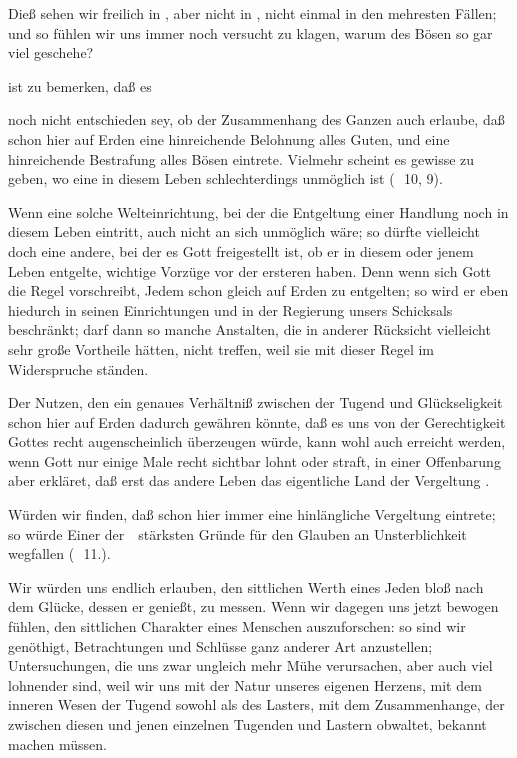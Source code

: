 \begin{aufza}
\begin{aufzb}
\begin{aufzc}
Dieß sehen wir freilich in , aber nicht in , nicht einmal in den mehresten Fällen; und so fühlen wir uns immer noch versucht zu klagen, warum des Bösen so gar viel geschehe?
\end{aufzc}
\item {} ist zu bemerken, daß es
\begin{aufzc}
\item noch nicht entschieden sey, ob der Zusammenhang des Ganzen auch erlaube, daß schon hier auf Erden eine hinreichende Belohnung alles Guten, und eine hinreichende Bestrafung alles Bösen eintrete. Vielmehr scheint es gewisse  zu geben, wo eine  in diesem Leben schlechterdings unmöglich ist (\ \no\,10, 9).
\item Wenn eine solche Welteinrichtung, bei der die Entgeltung einer Handlung noch in diesem Leben eintritt, auch nicht an sich unmöglich wäre; so dürfte vielleicht doch eine andere, bei der es Gott freigestellt ist, ob er in diesem oder jenem Leben entgelte, wichtige Vorzüge vor der ersteren haben. Denn wenn sich Gott die Regel vorschreibt, Jedem schon gleich auf Erden zu entgelten; so wird er eben hiedurch in seinen Einrichtungen und in der Regierung unsers Schicksals beschränkt; darf dann so manche Anstalten, die in anderer Rücksicht vielleicht sehr große Vortheile hätten, nicht treffen, weil sie mit dieser Regel im Widerspruche ständen.
\item Der Nutzen, den ein genaues Verhältniß zwischen der Tugend und Glückseligkeit schon hier auf Erden dadurch gewähren könnte, daß es uns von der Gerechtigkeit Gottes recht augenscheinlich überzeugen würde, kann wohl auch erreicht werden, wenn Gott nur einige Male recht sichtbar lohnt oder straft, in einer Offenbarung aber erkläret, daß erst das andere Leben das eigentliche Land der Vergeltung .
\item Würden wir finden, daß schon hier immer eine hinlängliche Vergeltung eintrete; so würde Einer der~\ stärksten Gründe für den Glauben an Unsterblichkeit wegfallen (\ \no\,11.).
\item Wir würden uns endlich erlauben, den sittlichen Werth eines Jeden bloß nach dem Glücke, dessen er genießt, zu messen. Wenn wir dagegen uns jetzt bewogen fühlen, den sittlichen Charakter eines Menschen auszuforschen: so sind wir genöthigt, Betrachtungen und Schlüsse ganz anderer Art anzustellen; Untersuchungen, die uns zwar ungleich mehr Mühe verursachen, aber auch viel lohnender sind, weil wir uns mit der Natur unseres eigenen Herzens, mit dem inneren Wesen der Tugend sowohl als des Lasters, mit dem Zusammenhange, der zwischen diesen und jenen einzelnen Tugenden und Lastern obwaltet, bekannt machen müssen.

\end{aufzc}
\end{aufzb}
\end{aufza}
